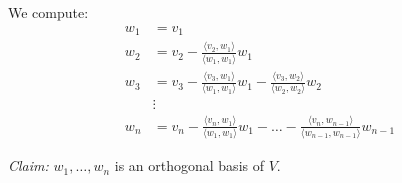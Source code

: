 \documentclass[11pt]{article}
\begin{document}
    We compute:
    \begin{align*}
        w_1 &= v_1 \\
        w_2 &= v_2 - \frac{\langle v_2, w_1 \rangle}{\langle w_1, w_1 \rangle} w_1 \\
        w_3 &= v_3 - \frac{\langle v_3, w_1 \rangle}{\langle w_1, w_1 \rangle} w_1 - \frac{\langle v_3, w_2 \rangle}{\langle w_2, w_2 \rangle} w_2 \\
        &\vdots \\
        w_n &= v_n - \frac{\langle v_n, w_1 \rangle}{\langle w_1, w_1 \rangle} w_1 - \dots - \frac{\langle v_n, w_{n-1} \rangle}{\langle w_{n-1}, w_{n-1} \rangle} w_{n-1}
    \end{align*}

    \emph{Claim:} \(w_1, \dots, w_n\) is an orthogonal basis of $V$.
\end{document}
